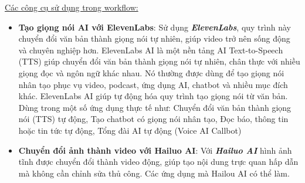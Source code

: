 \underline{Các công cụ sử dụng trong workflow:}\\
\begin{itemize}[label=-]
    \item \textbf{Tạo giọng nói AI với ElevenLabs}: Sử dụng \textbf{\emph{ElevenLabs}}, quy trình này chuyển đổi văn bản thành giọng nói tự nhiên, giúp video trở nên sống động và chuyên nghiệp hơn. ElevenLabs AI là một nền tảng AI Text-to-Speech (TTS) giúp chuyển đổi văn bản thành giọng nói tự nhiên, chân thực với nhiều giọng đọc và ngôn ngữ khác nhau. Nó thường được dùng để tạo giọng nói nhân tạo phục vụ video, podcast, ứng dụng AI, chatbot và nhiều mục đích khác. ElevenLabs AI giúp tự động hóa quy trình tạo giọng nói từ văn bản. Dùng trong một số ứng dụng thực tế như: Chuyển đổi văn bản thành giọng nói (TTS) tự động, Tạo chatbot có giọng nói nhân tạo, Đọc báo, thông tin hoặc tin tức tự động, Tổng đài AI tự động (Voice AI Callbot)
    \item \textbf{Chuyển đổi ảnh thành video với Hailuo AI}: Với  \textbf{\emph{Hailuo AI}} hình ảnh tĩnh được chuyển đổi thành video động, giúp tạo nội dung trực quan hấp dẫn mà không cần chỉnh sửa thủ công. Các ứng dụng mà Hailou AI có thể làm.\\


\end{itemize}
